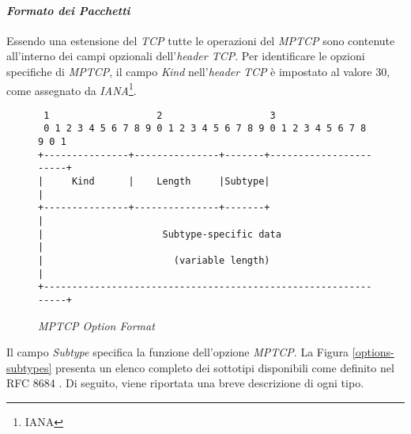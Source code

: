 \paragraph{\textit{Formato dei Pacchetti}}
\noindent Essendo una estensione del \emph{TCP} tutte le operazioni del \emph{MPTCP} sono contenute all'interno dei campi opzionali dell'\emph{header TCP}. 
Per identificare le opzioni specifiche di \emph{MPTCP}, il campo \emph{Kind} nell'\emph{header} \emph{TCP} è impostato al valore 30, come assegnato da \emph{IANA}\footnote{\gls{IANA}}.
\begin{figure}[!h]
    \centering
          \begin{BVerbatim}
 1                   2                   3
 0 1 2 3 4 5 6 7 8 9 0 1 2 3 4 5 6 7 8 9 0 1 2 3 4 5 6 7 8 9 0 1
+---------------+---------------+-------+-----------------------+
|     Kind      |    Length     |Subtype|                       |
+---------------+---------------+-------+                       |
|                     Subtype-specific data                     |
|                       (variable length)                       |
+---------------------------------------------------------------+   
        \end{BVerbatim}
    \caption{\emph{MPTCP Option Format}}
    \label{mptcp-option-format}
\end{figure}

\noindent Il campo \emph{Subtype} specifica la funzione dell'opzione \emph{MPTCP}. La Figura \ref{options-subtypes} presenta un elenco completo dei sottotipi disponibili come definito nel RFC 8684 \cite{site:mptcp-packet}. Di seguito, viene riportata una breve descrizione di ogni tipo.

